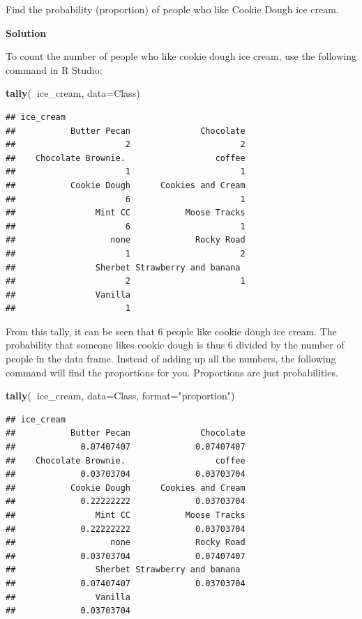 \documentclass[
]{book}
\newenvironment{Shaded}{\begin{snugshade}}{\end{snugshade}}
\newcommand{\DataTypeTok}[1]{\textcolor[rgb]{0.13,0.29,0.53}{#1}}
\newcommand{\KeywordTok}[1]{\textcolor[rgb]{0.13,0.29,0.53}{\textbf{#1}}}
\newcommand{\NormalTok}[1]{#1}
\newcommand{\OperatorTok}[1]{\textcolor[rgb]{0.81,0.36,0.00}{\textbf{#1}}}
\newcommand{\StringTok}[1]{\textcolor[rgb]{0.31,0.60,0.02}{#1}}
\begin{document}
Find the probability (proportion) of people who like Cookie Dough ice cream.

\textbf{Solution}

To count the number of people who like cookie dough ice cream, use the following command in R Studio:

\begin{Shaded}
\begin{Highlighting}[]
\KeywordTok{tally}\NormalTok{(}\OperatorTok{~}\NormalTok{ice_cream, }\DataTypeTok{data=}\NormalTok{Class)}
\end{Highlighting}
\end{Shaded}

\begin{verbatim}
## ice_cream
##           Butter Pecan              Chocolate 
##                      2                      2 
##    Chocolate Brownie.                  coffee 
##                      1                      1 
##           Cookie Dough      Cookies and Cream 
##                      6                      1 
##                Mint CC           Moose Tracks 
##                      6                      1 
##                   none             Rocky Road 
##                      1                      2 
##                Sherbet Strawberry and banana  
##                      2                      1 
##                Vanilla 
##                      1
\end{verbatim}

From this tally, it can be seen that 6 people like cookie dough ice cream. The probability that someone likes cookie dough is thus 6 divided by the number of people in the data frame. Instead of adding up all the numbers, the following command will find the proportions for you. Proportions are just probabilities.

\begin{Shaded}
\begin{Highlighting}[]
\KeywordTok{tally}\NormalTok{(}\OperatorTok{~}\NormalTok{ice_cream, }\DataTypeTok{data=}\NormalTok{Class, }\DataTypeTok{format=}\StringTok{"proportion"}\NormalTok{)}
\end{Highlighting}
\end{Shaded}

\begin{verbatim}
## ice_cream
##           Butter Pecan              Chocolate 
##             0.07407407             0.07407407 
##    Chocolate Brownie.                  coffee 
##             0.03703704             0.03703704 
##           Cookie Dough      Cookies and Cream 
##             0.22222222             0.03703704 
##                Mint CC           Moose Tracks 
##             0.22222222             0.03703704 
##                   none             Rocky Road 
##             0.03703704             0.07407407 
##                Sherbet Strawberry and banana  
##             0.07407407             0.03703704 
##                Vanilla 
##             0.03703704
\end{verbatim}
\end{document}

